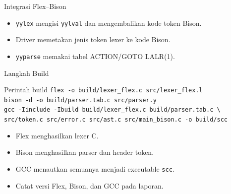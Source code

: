 \documentclass[aspectratio=169,10pt,t]{beamer}
\begin{document}
\begin{frame}{Integrasi Flex--Bison}
  \begin{center}
  \end{center}

  \begin{itemize}
    \item \texttt{yylex} mengisi \texttt{yylval} dan mengembalikan kode
          token Bison.
    \item Driver memetakan jenis token lexer ke kode Bison.
    \item \texttt{yyparse} memakai tabel ACTION/GOTO LALR(1).
  \end{itemize}
\end{frame}

\begin{frame}{Langkah Build}
  \begin{block}{Perintah build}
    \scriptsize
    \texttt{flex -o build/lexer\_flex.c src/lexer\_flex.l}\\[2pt]
    \texttt{bison -d -o build/parser.tab.c src/parser.y}\\[2pt]
    \texttt{gcc -Iinclude -Ibuild build/lexer\_flex.c
    build/parser.tab.c \textbackslash}\\
    \texttt{\hspace*{1.1cm}src/token.c src/error.c src/ast.c
    src/main\_bison.c -o build/scc}
  \end{block}

  \begin{itemize}
    \item Flex menghasilkan lexer C.
    \item Bison menghasilkan parser dan header token.
    \item GCC menautkan semuanya menjadi executable
          \texttt{scc}.
    \item Catat versi Flex, Bison, dan GCC pada laporan.
  \end{itemize}
\end{frame}
\end{document}
